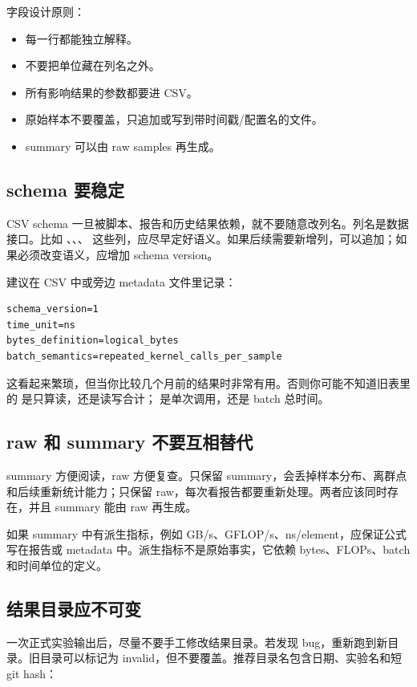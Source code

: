 字段设计原则：

\begin{itemize}
  \item 每一行都能独立解释。
  \item 不要把单位藏在列名之外。
  \item 所有影响结果的参数都要进 CSV。
  \item 原始样本不要覆盖，只追加或写到带时间戳/配置名的文件。
  \item summary 可以由 raw samples 再生成。
\end{itemize}

\subsection{schema 要稳定}

CSV schema 一旦被脚本、报告和历史结果依赖，就不要随意改列名。列名是数据接口。比如 、、、 这些列，应尽早定好语义。如果后续需要新增列，可以追加；如果必须改变语义，应增加 schema version。

建议在 CSV 中或旁边 metadata 文件里记录：

\begin{lstlisting}
schema_version=1
time_unit=ns
bytes_definition=logical_bytes
batch_semantics=repeated_kernel_calls_per_sample
\end{lstlisting}

这看起来繁琐，但当你比较几个月前的结果时非常有用。否则你可能不知道旧表里的  是只算读，还是读写合计； 是单次调用，还是 batch 总时间。

\subsection{raw 和 summary 不要互相替代}

summary 方便阅读，raw 方便复查。只保留 summary，会丢掉样本分布、离群点和后续重新统计能力；只保留 raw，每次看报告都要重新处理。两者应该同时存在，并且 summary 能由 raw 再生成。

如果 summary 中有派生指标，例如 GB/s、GFLOP/s、ns/element，应保证公式写在报告或 metadata 中。派生指标不是原始事实，它依赖 bytes、FLOPs、batch 和时间单位的定义。

\subsection{结果目录应不可变}

一次正式实验输出后，尽量不要手工修改结果目录。若发现 bug，重新跑到新目录。旧目录可以标记为 invalid，但不要覆盖。推荐目录名包含日期、实验名和短 git hash：

